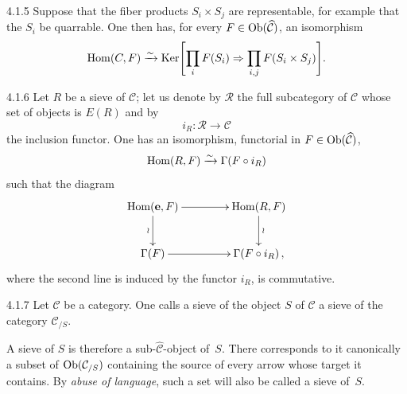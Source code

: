 \begin{corollary}{4.1.5}
\label{IV.4.1.5}
Suppose that the fiber products \(S_{i}\times S_{j}\) are representable,
for example that the \(S_{i}\) be quarrable. One then has, for every
\(F\in\operatorname{Ob}(\widehat{\mathcal{C}})\), an isomorphism
\[
\operatorname{Hom}(C,F)\xrightarrow{\sim}
\operatorname{Ker}\Biggl[\prod_{i}F(S_{i})
  \Rightarrow
  \prod_{i,j}F(S_{i}\times S_{j})\Biggr].
\]
\end{corollary}

\begin{remark}{4.1.6}
\label{IV.4.1.6}
Let \(R\) be a sieve of \(\mathcal{C}\); let us denote by \(\mathcal{R}\)
the full subcategory of \(\mathcal{C}\) whose set of objects is \(E(R)\)
and by
\[
i_{R}\colon\mathcal{R}\longrightarrow\mathcal{C}
\]
the inclusion functor. One has an isomorphism, functorial in
\(F\in\operatorname{Ob}(\widehat{\mathcal{C}})\),
\[
\operatorname{Hom}(R,F)\xrightarrow{\sim}\Gamma(F\circ i_{R})
\]
such that the diagram
\[
\xymatrix@C=4.2em@R=2.6em{
\Hom(\mathbf{e},F) \ar[r] \ar[d]_{\wr}
  & \Hom(R,F) \ar[d]^{\wr} \\
\Gamma(F) \ar[r]
  & \Gamma(F\circ i_{R})
\,,}
\]
where the second line is induced by the functor \(i_{R}\), is commutative.
\end{remark}

\begin{definition}{4.1.7}
\label{IV.4.1.7}
Let \(\mathcal{C}\) be a category. One calls a sieve of the object \(S\) of
\(\mathcal{C}\) a sieve of the category \(\mathcal{C}_{/S}\).
\end{definition}

A sieve of \(S\) is therefore a sub-\(\widehat{\mathcal{C}}\)-object
of~\(S\). There corresponds to it canonically a subset of
\(\operatorname{Ob}(\mathcal{C}_{/S})\) containing the source of every arrow whose target
it contains. By \emph{abuse of language}, such a set will also be called a
sieve of~\(S\).

\label{IV.sec.4.2}

